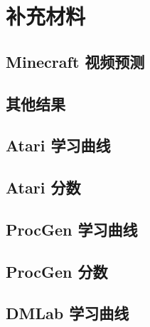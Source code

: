 \clearpage
\section*{补充材料}

\subsection*{Minecraft 视频预测}

\vspace*{-4ex}

\clearpage
\subsection*{其他结果}
\noindent
\begin{minipage}[b]{.46\textwidth}

\end{minipage}\hfill
\begin{minipage}[b]{.46\textwidth}

\end{minipage}



\clearpage
\subsection*{Atari 学习曲线}


\clearpage
\subsection*{Atari 分数}
\vspace*{-1ex}


\clearpage
\subsection*{ProcGen 学习曲线}


\clearpage
\subsection*{ProcGen 分数}


\clearpage
\subsection*{DMLab 学习曲线}


